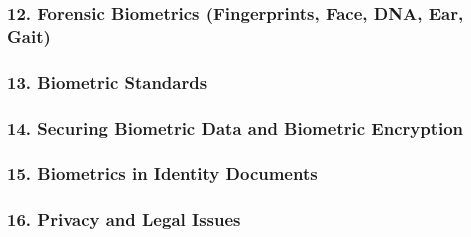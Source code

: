 \documentclass[a4paper]{article}
\begin{document}
    \subsubsection*{12. Forensic Biometrics (Fingerprints, Face, DNA, Ear, Gait)}
    \subsubsection*{13. Biometric Standards}
    \subsubsection*{14. Securing Biometric Data and Biometric Encryption}
    \subsubsection*{15. Biometrics in Identity Documents}
    \subsubsection*{16. Privacy and Legal Issues}
\end{document}
